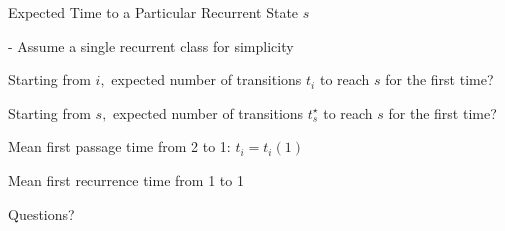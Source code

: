 \begin{frame}{Expected Time to a Particular Recurrent State $s$}

- Assume a single recurrent class for simplicity
{
\small
\plitemsep 0.1in
\bci
\item<2->[\redf{(Q)}]  Starting from $i,$ expected number of transitions $t_i$ to reach $s$ for the first time?

\item<4->[\redf{(Q)}]  Starting from $s,$ expected number of transitions $t_s^\star$ to reach $s$ for the first time?

\eci
}
{
\vspace{-0.3cm}
}

\vspace{-0.3cm}
\small
 \plitemsep 0.01in
 \bci
 \item<3-> Mean first passage time from 2 to 1: $t_i = t_i(1)$
\vspace{-0.2cm}
 \item<5-> Mean first recurrence time from 1 to 1
\vspace{-0.2cm}

 \eci


\end{frame}

\begin{frame}{}
\vspace{2cm}
\LARGE Questions?

\end{frame}

